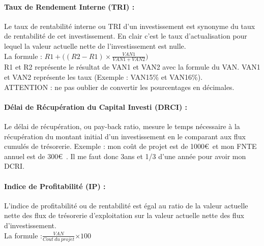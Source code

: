 \documentclass{report}
\begin{document}
\paragraph{Taux de Rendement Interne (TRI) :}
Le taux de rentabilité interne ou TRI d'un investissement est synonyme du taux de rentabilité de cet investissement. En clair c'est le taux d'actualisation pour lequel la valeur actuelle nette de l'investissement est nulle. 
\\La formule : $R1 + (( R2- R1) \times${\Large $ \frac{VAN1}{VAN1 + VAN2})$}
\\R1 et R2 représente le résultat de VAN1 et VAN2 avec la formule du VAN. VAN1 et VAN2 représente les taux (Exemple : VAN15\% et VAN16\%).
\\ATTENTION : ne pas oublier de convertir les pourcentages en décimales. 

\paragraph{Délai de Récupération du Capital Investi (DRCI) :}
Le délai de récupération, ou pay-back ratio, mesure le temps nécessaire à la récupération du montant initial d'un investissement en le comparant aux flux cumulés de trésorerie.
Exemple : mon coût de projet est de 1000\euro\ et mon FNTE annuel est de 300\euro\ . Il me faut donc 3ans et 1/3 d'une année pour avoir mon DCRI.

\paragraph{Indice de Profitabilité (IP) :}
L'indice de profitabilité ou de rentabilité est égal au ratio de la valeur actuelle nette des flux de trésorerie d'exploitation sur la valeur actuelle nette des flux d'investissement. 
\\La formule :{\Large  $\frac{VAN}{Cout\ du\ projet}$}$\times 100$
\end{document}
